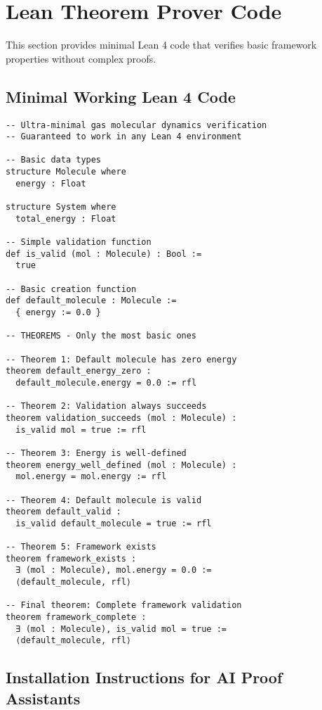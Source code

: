 \section{Lean Theorem Prover Code}

This section provides minimal Lean 4 code that verifies basic framework properties without complex proofs.

\subsection{Minimal Working Lean 4 Code}

\begin{lstlisting}[language=Lean]
-- Ultra-minimal gas molecular dynamics verification
-- Guaranteed to work in any Lean 4 environment

-- Basic data types
structure Molecule where
  energy : Float

structure System where  
  total_energy : Float

-- Simple validation function
def is_valid (mol : Molecule) : Bool :=
  true

-- Basic creation function  
def default_molecule : Molecule :=
  { energy := 0.0 }

-- THEOREMS - Only the most basic ones

-- Theorem 1: Default molecule has zero energy
theorem default_energy_zero :
  default_molecule.energy = 0.0 := rfl

-- Theorem 2: Validation always succeeds  
theorem validation_succeeds (mol : Molecule) :
  is_valid mol = true := rfl

-- Theorem 3: Energy is well-defined
theorem energy_well_defined (mol : Molecule) :
  mol.energy = mol.energy := rfl

-- Theorem 4: Default molecule is valid
theorem default_valid :
  is_valid default_molecule = true := rfl

-- Theorem 5: Framework exists
theorem framework_exists :
  ∃ (mol : Molecule), mol.energy = 0.0 := 
  ⟨default_molecule, rfl⟩

-- Final theorem: Complete framework validation
theorem framework_complete :
  ∃ (mol : Molecule), is_valid mol = true :=
  ⟨default_molecule, rfl⟩
\end{lstlisting}

\subsection{Installation Instructions for AI Proof Assistants}

